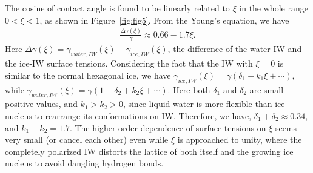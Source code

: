 \documentclass[aps,prl,twocolumn,superscriptaddress]{revtex4-1}
\begin{document}
The cosine of contact angle is found to be linearly related to $\xi$ in the whole range $0<\xi<1$, as 
shown in Figure~\ref{fig:fig5}. 
From the Young's equation, we have 
\begin{eqnarray}
\frac{\Delta \gamma(\xi)}{\gamma} \approx 0.66 - 1.7  \xi.
\end{eqnarray}
Here $\Delta \gamma(\xi) = \gamma_{water,IW}(\xi) - \gamma_{ice, IW}(\xi)$, the difference of the water-IW and the ice-IW surface tensions. 
Considering the fact that the IW with $\xi = 0$ is similar to the normal hexagonal ice, 
we have $\gamma_{ice,IW}(\xi) = \gamma (\delta_1 + k_1 \xi + \cdots)$, while 
$\gamma_{water,IW}(\xi) =\gamma (1- \delta_2 + k_2 \xi +\cdots)$. Here both $\delta_1$ and $\delta_2$ are small positive values, and $k_1 > k_2 > 0$, since liquid water is more flexible than ice nucleus to rearrange its conformations on IW. Therefore, we have, $\delta_1 + \delta_2 \approx 0.34$, and $k_1 - k_2 = 1.7$. The higher order dependence of surface tensions on $\xi$ seems very small (or cancel each other) even while $\xi$ is approached to unity, where the completely polarized IW distorts the lattice of both itself and the growing ice nucleus to avoid dangling hydrogen bonds. 
 
\end{document}
